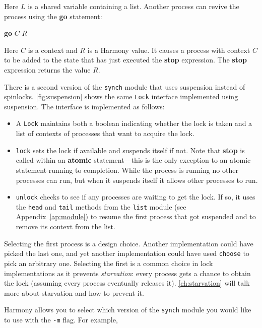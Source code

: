 \documentclass{report}
\newenvironment{code}{
\tcolorbox
}{
\endtcolorbox
}
\begin{document}
Here $L$ is a shared variable containing a list.
Another process can revive the process using the \textbf{go}
%
statement:

\begin{code}
\textbf{go} $C$ $R$
\end{code}

Here $C$ is a context and $R$ is a Harmony value.
It causes a process with context $C$ to be added to the state that has
just executed the \textbf{stop}
%
expression.  The \textbf{stop} expression returns the value $R$.

There is a second version of the \texttt{synch} module that uses suspension
instead of spinlocks.
\autoref{fig:suspension} shows the same \texttt{Lock} interface implemented
using suspension.
The interface is implemented as follows:
\begin{itemize}
\item A \texttt{Lock} maintains both a boolean indicating whether the
lock is taken and a list of contexts of processes that want to acquire the lock.
\item
\texttt{lock}
%
sets the lock if available and suspends itself if not.
Note that \textbf{stop} is called within an \textbf{atomic} statement---this is
the only exception to an atomic statement running to completion.  While the
process is running no other processes can run, but when it suspends itself
it allows other processes to run.
\item
\texttt{unlock}
%
checks to see if any processes are waiting to get the lock.
If so, it uses the \texttt{head} and \texttt{tail}
methods from the \texttt{list} module (see Appendix~\ref{ap:module})
to resume the first process that got
suspended and to remove its context from the list.
\end{itemize}
Selecting the first process is a design choice.  Another implementation could
have picked the last one, and yet another implementation could have used
\texttt{choose} to pick an arbitrary one.  Selecting the first is a common
choice in lock implementations as it prevents \emph{starvation}:
%
every process
gets a chance to obtain the lock (assuming every process eventually releases
it).  \autoref{ch:starvation} will talk more about starvation and how
to prevent it.

Harmony allows you to select which version of the \texttt{synch} module you would
like to use with the \texttt{-m} flag.
%
For example,
\end{document}
